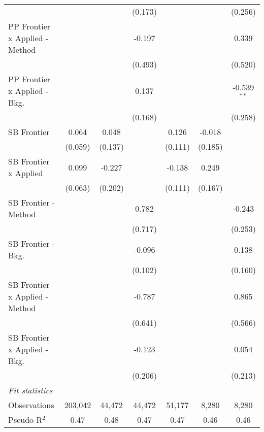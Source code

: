\begin{tabular}{lcccccc}
                                  &                &               & (0.173)     &               &               & (0.256)\\   
   PP Frontier x Applied - Method &                &               & -0.197      &               &               & 0.339\\   
                                  &                &               & (0.493)     &               &               & (0.520)\\   
   PP Frontier x Applied - Bkg.   &                &               & 0.137       &               &               & -0.539$^{**}$\\   
                                  &                &               & (0.168)     &               &               & (0.258)\\   
   SB Frontier                    & 0.064          & 0.048         &             & 0.126         & -0.018        &   \\   
                                  & (0.059)        & (0.137)       &             & (0.111)       & (0.185)       &   \\   
   SB Frontier x Applied          & 0.099          & -0.227        &             & -0.138        & 0.249         &   \\   
                                  & (0.063)        & (0.202)       &             & (0.111)       & (0.167)       &   \\   
   SB Frontier - Method           &                &               & 0.782       &               &               & -0.243\\   
                                  &                &               & (0.717)     &               &               & (0.253)\\   
   SB Frontier - Bkg.             &                &               & -0.096      &               &               & 0.138\\   
                                  &                &               & (0.102)     &               &               & (0.160)\\   
   SB Frontier x Applied - Method &                &               & -0.787      &               &               & 0.865\\   
                                  &                &               & (0.641)     &               &               & (0.566)\\   
   SB Frontier x Applied - Bkg.   &                &               & -0.123      &               &               & 0.054\\   
                                  &                &               & (0.206)     &               &               & (0.213)\\   
   \midrule
   \emph{Fit statistics}\\
   Observations                   & 203,042        & 44,472        & 44,472      & 51,177        & 8,280         & 8,280\\  
   Pseudo R$^2$                   & 0.47           & 0.48          & 0.47        & 0.47          & 0.46          & 0.46\\  
   

\end{tabular}
